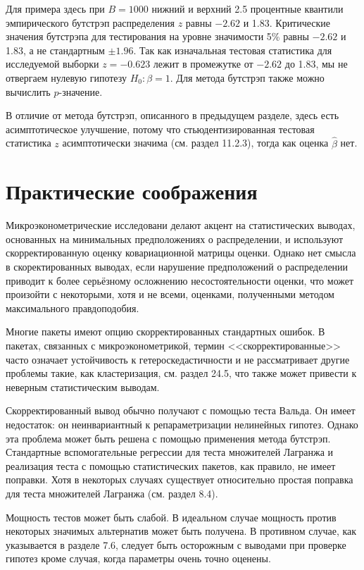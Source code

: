 Для примера здесь при $B = 1 000$ нижний и верхний 2.5 процентные квантили эмпирического бутстрэп распределения  $z$ равны $- 2.62$ и 1.83. Критические значения бутстрэпа для тестирования на уровне значимости 5\% равны $- 2.62$ и 1.83, а не стандартным $\pm 1.96$. Так как изначальная тестовая статистика для исследуемой выборки $z = - 0.623$ лежит в промежутке от $- 2.62$ до 1.83, мы не отвергаем нулевую гипотезу $H_0: \beta = 1$. Для метода  
бутстрэп также можно вычислить $p$-значение.

В отличие от метода бутстрэп, описанного в предыдущем разделе, здесь есть асимптотическое улучшение, потому что стьюдентизированная тестовая статистика $z$ асимптотически значима (см. раздел 11.2.3), тогда как оценка $\hat{\beta}$ нет.

\section{Практические соображения}

Микроэконометрические исследовани делают акцент на статистических выводах, основанных на минимальных предположениях о распределении, и используют скорректированную оценку ковариационной матрицы оценки. Однако нет смысла в скоректированных выводах, если нарушение предположений о распределении приводит к более серьёзному осложнению несостоятельности оценки, что может произойти с некоторыми, хотя и не всеми, оценками, полученными методом максимального правдоподобия.

Многие пакеты имеют опцию скорректированных стандартных ошибок. В пакетах, связанных с микроэконометрикой, термин <<скорректированные>> часто означает устойчивость к гетероскедастичности и не рассматривает другие проблемы такие, как кластеризация, см. раздел 24.5, что также может привести к неверным статистическим выводам.

Скорректированный вывод обычно получают с помощью теста Вальда. Он имеет недостаток: он неинвариантный к репараметризации нелинейных гипотез. Однако эта проблема может быть решена с помощью применения метода бутстрэп. Стандартные вспомогательные регрессии для теста множителей Лагранжа и реализация теста с помощью статистических пакетов, как правило, не имеет поправки. Хотя в некоторых случаях существует относительно простая поправка для теста множителей Лагранжа (см. раздел 8.4).

Мощность тестов может быть слабой. В идеальном случае мощность против некоторых значимых альтернатив может быть получена. В противном случае, как указывается в разделе 7.6, следует быть осторожным с выводами при проверке гипотез кроме случая, когда параметры очень точно оценены.

